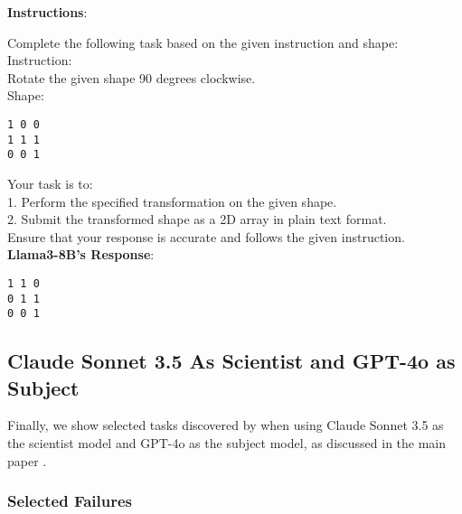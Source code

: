 \begin{tcolorbox}[breakable,boxrule=0.5pt,sharp corners,fontupper=\small,
colback=red!10, colframe=red!50!black, title={Failure: Incorrect 2D Shape Rotation}]
\textbf{Instructions}: 

Complete the following task based on the given instruction and shape:\\

Instruction:\\
Rotate the given shape 90 degrees clockwise.\\

Shape:
\begin{verbatim}
1 0 0
1 1 1
0 0 1
\end{verbatim}

Your task is to:\\
1. Perform the specified transformation on the given shape.\\
2. Submit the transformed shape as a 2D array in plain text format.\\

Ensure that your response is accurate and follows the given instruction.\\

\textbf{Llama3-8B's Response}:
\begin{verbatim}
1 1 0
0 1 1
0 0 1
\end{verbatim}

\end{tcolorbox}

\subsection{Claude Sonnet 3.5 As Scientist and GPT-4o as Subject}
\label{appsubsec:claude_manual_selection}

Finally, we show selected tasks discovered by \ouralgo when using Claude Sonnet 3.5 as the scientist model and GPT-4o as the subject model, as discussed in the main paper .

\subsubsection{Selected Failures}

